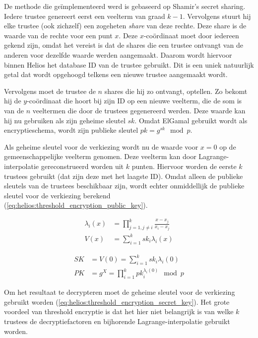 De methode die ge\"implementeerd werd is gebaseerd op Shamir's secret sharing.\cite{shamir_how_to_share_a_secret} Iedere trustee genereert eerst een veelterm van graad $k - 1$. Vervolgens stuurt hij elke trustee (ook zichzelf) een zogeheten \textit{share} van deze rechte. Deze share is de waarde van de rechte voor een punt $x$. Deze $x$-co\"ordinaat moet door iedereen gekend zijn, omdat het vereist is dat de shares die een trustee ontvangt van de anderen voor dezelfde waarde werden aangemaakt. Daarom wordt hiervoor binnen Helios het database ID van de trustee gebruikt. Dit is een uniek natuurlijk getal dat wordt opgehoogd telkens een nieuwe trustee aangemaakt wordt.

\npar Vervolgens moet de trustee de $n$ shares die hij zo ontvangt, optellen. Zo bekomt hij de $y$-co\"ordinaat die hoort bij zijn ID op een nieuwe veelterm, die de som is van de $n$ veeltermen die door de trustees gegenereerd werden. Deze waarde kan hij nu gebruiken als zijn geheime sleutel ${sk}$. Omdat ElGamal gebruikt wordt als encryptieschema, wordt zijn publieke sleutel ${pk} = g^{sk} \mod{p}$.

\npar Als geheime sleutel voor de verkiezing wordt nu de waarde voor $x = 0$ op de gemeenschappelijke veelterm genomen. Deze veelterm kan door Lagrange-interpolatie gereconstrueerd worden uit $k$ punten. Hiervoor worden de eerste $k$ trustees gebruikt (dat zijn deze met het laagste ID). Omdat alleen de publieke sleutels van de trustees beschikbaar zijn, wordt echter onmiddellijk de publieke sleutel voor de verkiezing berekend (\ref{eq:helios:threshold_encryption_public_key}).

\begin{align}
  \label{eq:helios:threshold_encryption_lagrange}
  \lambda_i(x) & = \prod_{j=1, j\not=i}^k{\frac{x - x_j}{x_i - x_j}} \\
  \label{eq:helios:threshold_encryption_polynomial}
  V(x) & = \sum_{i=1}^k{{sk}_i\lambda_i(x)}
\end{align}

\begin{align}
  \label{eq:helios:threshold_encryption_secret_key}
  SK & = V(0) = \sum_{i=1}^k{{sk}_i\lambda_i(0)} \\
  \label{eq:helios:threshold_encryption_public_key}
  PK & = g^{X} = \prod_{i=1}^k{{pk}_i^{\lambda_i(0)}} \mod{p}
\end{align}

\npar Om het resultaat te decrypteren moet de geheime sleutel voor de verkiezing gebruikt worden (\ref{eq:helios:threshold_encryption_secret_key}). Het grote voordeel van threshold encryptie is dat het hier niet belangrijk is van welke $k$ trustees de decryptiefactoren en bijhorende Lagrange-interpolatie gebruikt worden.

